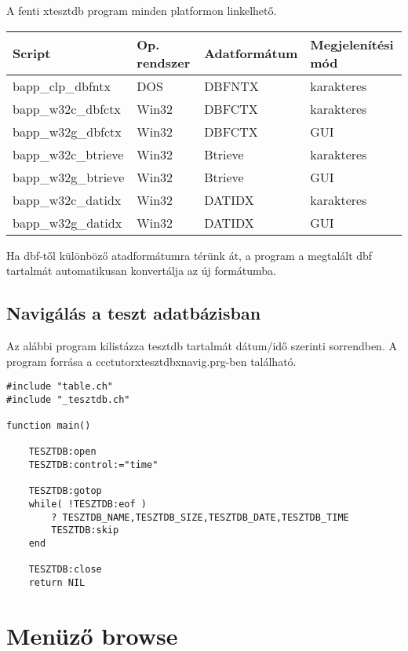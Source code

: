 A fenti xtesztdb program minden platformon linkelhető. 
\begin{center}
\begin{tabular}{|l|l|l|l|} \hline
 Script              & Op. rendszer  & Adatformátum & Megjelenítési mód \\ \hline \hline
 bapp\_clp\_dbfntx   & DOS           & DBFNTX       & karakteres        \\ \hline 
 bapp\_w32c\_dbfctx  & Win32         & DBFCTX       & karakteres        \\ \hline 
 bapp\_w32g\_dbfctx  & Win32         & DBFCTX       & GUI               \\ \hline 
 bapp\_w32c\_btrieve & Win32         & Btrieve      & karakteres        \\ \hline 
 bapp\_w32g\_btrieve & Win32         & Btrieve      & GUI               \\ \hline 
 bapp\_w32c\_datidx  & Win32         & DATIDX       & karakteres        \\ \hline 
 bapp\_w32g\_datidx  & Win32         & DATIDX       & GUI               \\ \hline 
\end{tabular}
\end{center}
Ha dbf-től különböző atadformátumra térünk át, a program a megtalált
dbf tartalmát automatikusan konvertálja az új formátumba. 


\subsection{Navigálás a teszt adatbázisban}

Az alábbi program kilistázza tesztdb tartalmát dátum/idő szerinti sorrendben. 
A program forrása a ccctutor\bslash xtesztdb\bslash xnavig.prg-ben található.

\begin{verbatim}
#include "table.ch"
#include "_tesztdb.ch"

function main()

    TESZTDB:open
    TESZTDB:control:="time"

    TESZTDB:gotop
    while( !TESZTDB:eof )
        ? TESZTDB_NAME,TESZTDB_SIZE,TESZTDB_DATE,TESZTDB_TIME
        TESZTDB:skip
    end

    TESZTDB:close
    return NIL
\end{verbatim}


\section{Menüző browse}

